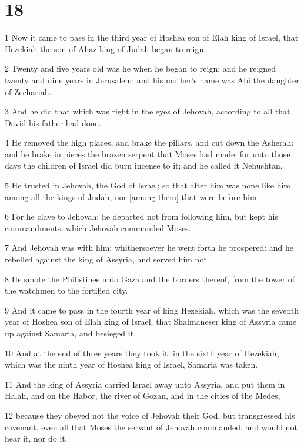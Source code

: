 \chapter{18}

\par 1 Now it came to pass in the third year of Hoshea son of Elah king of Israel, that Hezekiah the son of Ahaz king of Judah began to reign.
\par 2 Twenty and five years old was he when he began to reign; and he reigned twenty and nine years in Jerusalem: and his mother's name was Abi the daughter of Zechariah.
\par 3 And he did that which was right in the eyes of Jehovah, according to all that David his father had done.
\par 4 He removed the high places, and brake the pillars, and cut down the Asherah: and he brake in pieces the brazen serpent that Moses had made; for unto those days the children of Israel did burn incense to it; and he called it Nehushtan.
\par 5 He trusted in Jehovah, the God of Israel; so that after him was none like him among all the kings of Judah, nor [among them] that were before him.
\par 6 For he clave to Jehovah; he departed not from following him, but kept his commandments, which Jehovah commanded Moses.
\par 7 And Jehovah was with him; whithersoever he went forth he prospered: and he rebelled against the king of Assyria, and served him not.
\par 8 He smote the Philistines unto Gaza and the borders thereof, from the tower of the watchmen to the fortified city.
\par 9 And it came to pass in the fourth year of king Hezekiah, which was the seventh year of Hoshea son of Elah king of Israel, that Shalmaneser king of Assyria came up against Samaria, and besieged it.
\par 10 And at the end of three years they took it: in the sixth year of Hezekiah, which was the ninth year of Hoshea king of Israel, Samaria was taken.
\par 11 And the king of Assyria carried Israel away unto Assyria, and put them in Halah, and on the Habor, the river of Gozan, and in the cities of the Medes,
\par 12 because they obeyed not the voice of Jehovah their God, but transgressed his covenant, even all that Moses the servant of Jehovah commanded, and would not hear it, nor do it.

